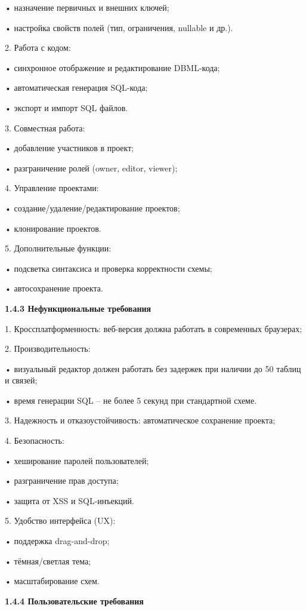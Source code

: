 	•	назначение первичных и внешних ключей;
    
	•	настройка свойств полей (тип, ограничения, nullable и др.).
    
	2.	Работа с кодом:
    
	•	синхронное отображение и редактирование DBML-кода;
    
	•	автоматическая генерация SQL-кода;
    
	•	экспорт и импорт SQL файлов.
    
	3.	Совместная работа:
    
	•	добавление участников в проект;
    
	•	разграничение ролей (owner, editor, viewer);
    
	4.	Управление проектами:
    
	•	создание/удаление/редактирование проектов;
    
	•	клонирование проектов.
    
	5.	Дополнительные функции:
    
	•	подсветка синтаксиса и проверка корректности схемы;
    
	•	автосохранение проекта.
    

\textbf{\large 1.4.3 Нефункциональные требования }

	1.	Кроссплатформенность: веб-версия должна работать в современных браузерах;
        
	2.	Производительность:
    
	•	визуальный редактор должен работать без задержек при наличии до 50 таблиц и связей;
    
	•	время генерации SQL – не более 5 секунд при стандартной схеме.
    
	3.	Надежность и отказоустойчивость: автоматическое сохранение проекта;
    
	4.	Безопасность:
    
	•	хеширование паролей пользователей;
    
	•	разграничение прав доступа;
    
	•	защита от XSS и SQL-инъекций.
    
	5.	Удобство интерфейса (UX):
    
	•	поддержка drag-and-drop;
    
	•	тёмная/светлая тема;
    
	•	масштабирование схем.

\textbf{\large 1.4.4 Пользовательские требования }

